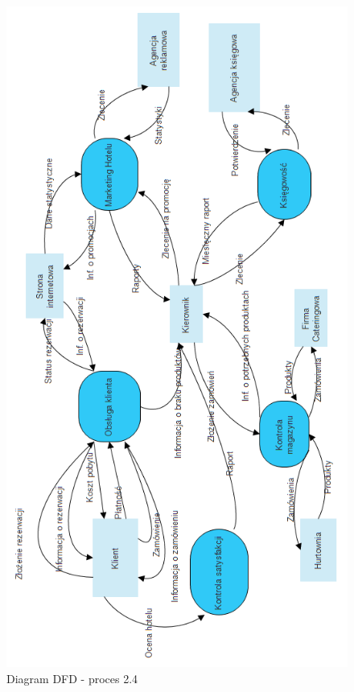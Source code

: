 \documentclass[a4paper, 11pt]{article}
\begin{document}
	\begin{figure}[H]%
			\center
			\includegraphics[scale=0.7]{Img/DFDpoziom0.png}
			\caption{Diagram DFD - proces 2.4}
	\end{figure}	
\end{document}
